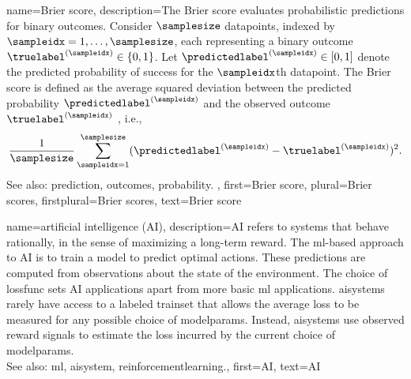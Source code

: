 {name={Brier score},
	description={The Brier score evaluates probabilistic \glspl{prediction} for binary \glspl{outcome}. 
		Consider $\samplesize$ \glspl{datapoint}, indexed by $\sampleidx=1,\ldots,\samplesize$, 
		each representing a binary \gls{outcome} $\truelabel^{(\sampleidx)} \in \{0,1\}$. 
		Let $\predictedlabel^{(\sampleidx)} \in [0,1]$ denote the predicted \gls{probability} 
		of success for the $\sampleidx$th \gls{datapoint}. The Brier score is defined as the 
		average squared deviation between the predicted \gls{probability} $\predictedlabel^{(\sampleidx)}$ 
		and the observed \gls{outcome} $\truelabel^{(\sampleidx)}$ \cite{Brier1950}, i.e., 
		\[
			\frac{1}{\samplesize}\sum_{\sampleidx=1}^{\samplesize} (\predictedlabel^{(\sampleidx)} - \truelabel^{(\sampleidx)})^2.
		\]
		See also: \gls{prediction}, \glspl{outcome}, \gls{probability}. },
	first={Brier score},
	plural={Brier scores},
	firstplural={Brier scores},
	text={Brier score}
}

{name={artificial intelligence (AI)}, 
	description={AI refers to systems that behave rationally, in the sense of 
		maximizing a long-term \gls{reward}. The \gls{ml}-based approach to AI is to train a \gls{model} to  
		predict optimal actions. These \glspl{prediction} are computed from observations about the \gls{state} of the 
		\gls{environment}. The choice of \gls{lossfunc} sets AI applications apart from more basic \gls{ml} applications. 
		\Glspl{aisystem} rarely have access to a labeled \gls{trainset} that allows the average \gls{loss} to be 
		measured for any possible choice of \glspl{modelparam}. Instead, \glspl{aisystem} use observed \gls{reward} 
		signals to estimate the \gls{loss} incurred by the current choice of \glspl{modelparam}.
				\\
		See also: \gls{ml}, \gls{aisystem}, \gls{reinforcementlearning}.},
	first={AI},
	text={AI} 
}
 
